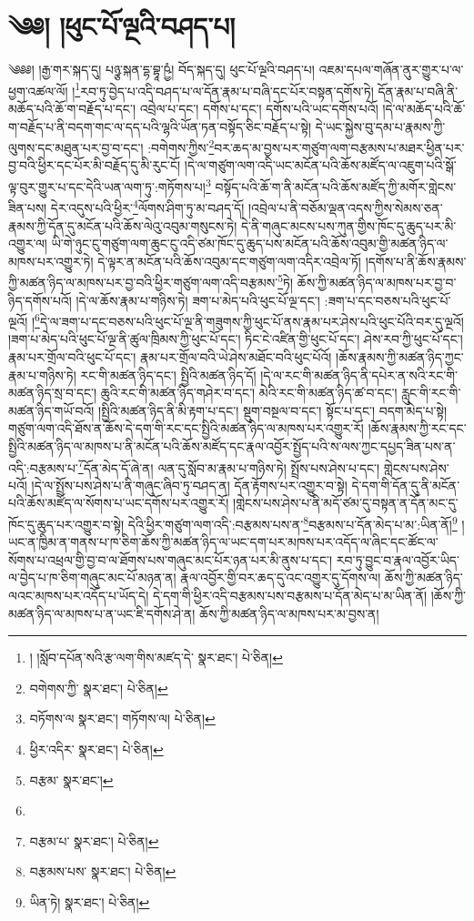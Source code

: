 \setcounter{footnote}{0} 
\chapter{༄༅། །ཕུང་པོ་ལྔའི་བཤད་པ།}༄༅༅། །རྒྱ་གར་སྐད་དུ། པཉྩ་སྐན་དྷ་བྷཱ་ཥྱཾ། བོད་སྐད་དུ། ཕུང་པོ་ལྔའི་བཤད་པ། འཇམ་དཔལ་གཞོན་ནུར་གྱུར་པ་ལ་ཕྱག་འཚལ་ལོ། །\footnote{། །སློབ་དཔོན་སའི་རྩ་ལག་གིས་མཛད་དེ་  སྣར་ཐང་།  པེ་ཅིན། }རབ་ཏུ་བྱེད་པ་འདི་བཤད་པ་ལ་དོན་རྣམ་པ་བཞི་དང་པོར་བསྟན་དགོས་ཏེ། དོན་རྣམ་པ་བཞི་ནི་མཆོད་པའི་ཆོ་ག་བརྗོད་པ་དང་། འབྲེལ་པ་དང་། དགོས་པ་དང་། དགོས་པའི་ཡང་དགོས་པའོ། །དེ་ལ་མཆོད་པའི་ཆོ་ག་བརྗོད་པ་ནི་བདག་གང་ལ་དད་པའི་ལྷའི་ཡོན་ཏན་བསྟོད་ཅིང་བརྗོད་པ་སྟེ། དེ་ཡང་སྐྱེས་བུ་དམ་པ་རྣམས་ཀྱི་ལུགས་དང་མཐུན་པར་བྱ་བ་དང་། :བགེགས་ཀྱིས་\footnote{བགེགས་ཀྱི་  སྣར་ཐང་།  པེ་ཅིན། }བར་ཆད་མ་བྱས་པར་གཙུག་ལག་བརྩམས་པ་མཐར་ཕྱིན་པར་བྱ་བའི་ཕྱིར་དང་པོར་མི་བརྗོད་དུ་མི་རུང་ངོ། །དེ་ལ་གཙུག་ལག་འདི་ཡང་མངོན་པའི་ཆོས་མཛོད་ལ་འཇུག་པའི་སྒོ་ལྟ་བུར་གྱུར་པ་དང་དེའི་ཡན་ལག་ཏུ་:གཏོགས་པ།\footnote{བཏོགས་ལ  སྣར་ཐང་། གཏོགས་ལ།  པེ་ཅིན། } བསྟོད་པའི་ཆོ་ག་ནི་མངོན་པའི་ཆོས་མཛོད་ཀྱི་མགོར་གླེངས་ཟིན་པས། དེར་འདུས་པའི་ཕྱིར་\footnote{ཕྱིར་འདིར་  སྣར་ཐང་།  པེ་ཅིན། }ལོགས་ཤིག་ཏུ་མ་བཤད་དོ། །འབྲེལ་པ་ནི་བཅོམ་ལྡན་འདས་ཀྱིས་སེམས་ཅན་རྣམས་ཀྱི་དོན་དུ་མངོན་པའི་ཆོས་ལེའུ་འབུམ་གསུངས་ཏེ། དེ་ནི་གཞུང་མངས་པས་ཀུན་གྱིས་ཁོང་དུ་ཆུད་པར་མི་འགྱུར་ལ། ཡི་གེ་ཉུང་ངུ་གཙུག་ལག་ཆུང་ངུ་འདི་ཙམ་ཁོང་དུ་ཆུད་པས་མངོན་པའི་ཆོས་འབུམ་གྱི་མཚན་ཉིད་ལ་མཁས་པར་འགྱུར་ཏེ། དེ་ལྟར་ན་མངོན་པའི་ཆོས་འབུམ་དང་གཙུག་ལག་འདིར་འབྲེལ་ཏོ། །དགོས་པ་ནི་ཆོས་རྣམས་ཀྱི་མཚན་ཉིད་ལ་མཁས་པར་བྱ་བའི་ཕྱིར་གཙུག་ལག་འདི་བརྩམས་\footnote{བརྩམ་  སྣར་ཐང་། }ཏེ། ཆོས་ཀྱི་མཚན་ཉིད་ལ་མཁས་པར་བྱ་བ་ཉིད་དགོས་པའོ། །དེ་ལ་ཆོས་རྣམ་པ་གཉིས་ཏེ། ཟག་པ་མེད་པའི་ཕུང་པོ་ལྔ་དང་། :ཟག་པ་དང་བཅས་པའི་ཕུང་པོ་ལྔའོ། །\footnote{}དེ་ལ་ཟག་པ་དང་བཅས་པའི་ཕུང་པོ་ལྔ་ནི་གཟུགས་ཀྱི་ཕུང་པོ་ནས་རྣམ་པར་ཤེས་པའི་ཕུང་པོའི་བར་དུ་ལྔའོ། །ཟག་པ་མེད་པའི་ཕུང་པོ་ལྔ་ནི་ཚུལ་ཁྲིམས་ཀྱི་ཕུང་པོ་དང་། ཏིང་ངེ་འཛིན་གྱི་ཕུང་པོ་དང་། ཤེས་རབ་ཀྱི་ཕུང་པོ་དང་། རྣམ་པར་གྲོལ་བའི་ཕུང་པོ་དང་། རྣམ་པར་གྲོལ་བའི་ཡེ་ཤེས་མཐོང་བའི་ཕུང་པོའོ། །ཆོས་རྣམས་ཀྱི་མཚན་ཉིད་ཀྱང་རྣམ་པ་གཉིས་ཏེ། རང་གི་མཚན་ཉིད་དང་། སྤྱིའི་མཚན་ཉིད་དོ། །དེ་ལ་རང་གི་མཚན་ཉིད་ནི་དཔེར་ན་སའི་རང་གི་མཚན་ཉིད་སྲ་བ་དང་། ཆུའི་རང་གི་མཚན་ཉིད་གཤེར་བ་དང་། མེའི་རང་གི་མཚན་ཉིད་ཚ་བ་དང་། རླུང་གི་རང་གི་མཚན་ཉིད་གཡོ་བའོ། །སྤྱིའི་མཚན་ཉིད་ནི་མི་རྟག་པ་དང་། སྡུག་བསྔལ་བ་དང་། སྟོང་པ་དང་། བདག་མེད་པ་སྟེ། གཙུག་ལག་འདི་ཐོས་ན་ཆོས་དེ་དག་གི་རང་དང་སྤྱིའི་མཚན་ཉིད་ལ་མཁས་པར་འགྱུར་རོ། །ཆོས་རྣམས་ཀྱི་རང་དང་སྤྱིའི་མཚན་ཉིད་ལ་མཁས་པ་ནི་མངོན་པའི་ཆོས་མཛོད་དང་རྣལ་འབྱོར་སྤྱོད་པའི་ས་ལས་ཀྱང་དཔྱད་ཟིན་པས་ན་འདི་:བརྩམས་པ་\footnote{བརྩམ་པ་  སྣར་ཐང་།  པེ་ཅིན། }དོན་མེད་དོ་ཞེ་ན། ལན་དུ་སློབ་མ་རྣམ་པ་གཉིས་ཏེ། སྤྲོས་པས་ཤེས་པ་དང་། གླེངས་པས་ཤེས་པའོ། །དེ་ལ་སྤྲོས་པས་ཤེས་པ་ནི་གཞུང་ཞིབ་ཏུ་བཤད་ན། དོན་རྟོགས་པར་འགྱུར་བ་སྟེ། དེ་དག་གི་དོན་དུ་ནི་མངོན་པའི་ཆོས་མཛོད་ལ་སོགས་པ་ཡང་དགོས་པར་འགྱུར་རོ། །གླེངས་པས་ཤེས་པ་ནི་མདོ་ཙམ་དུ་བསྟན་ན་དོན་མང་དུ་ཁོང་དུ་ཆུད་པར་འགྱུར་བ་སྟེ། དེའི་ཕྱིར་གཙུག་ལག་འདི་:བརྩམས་པས་ན་\footnote{བརྩམས་པས་  སྣར་ཐང་།  པེ་ཅིན། }བརྩམས་པ་དོན་མེད་པ་མ་:ཡིན་ནོ།\footnote{ཡིན་ཏེ།  སྣར་ཐང་།  པེ་ཅིན། } །ཡང་ན་ཁྱིམ་ན་གནས་པ་ཁ་ཅིག་ཆོས་ཀྱི་མཚན་ཉིད་ལ་ཡང་དག་པར་མཁས་པར་འདོད་ལ་ཞིང་དང་ཚོང་ལ་སོགས་པ་འཕྲལ་གྱི་བྱ་བ་ལ་ཐོགས་པས་གཞུང་མང་པོར་ཉན་པར་མི་ནུས་པ་དང་། རབ་ཏུ་བྱུང་བ་རྣལ་འབྱོར་ཡིད་ལ་བྱེད་པ་ཁ་ཅིག་གཞུང་མང་པོ་མཉན་ན། རྣལ་འབྱོར་གྱི་བར་ཆད་དུ་འང་འགྱུར་དུ་དོགས་ལ། ཆོས་ཀྱི་མཚན་ཉིད་ལའང་མཁས་པར་འདོད་པ་ཡོད་དེ། དེ་དག་གི་ཕྱིར་འདི་བརྩམས་པས་བརྩམས་པ་དོན་མེད་པ་མ་ཡིན་ནོ། །ཆོས་ཀྱི་མཚན་ཉིད་ལ་མཁས་པ་ན་ཡང་ཇི་དགོས་ཤེ་ན། ཆོས་ཀྱི་མཚན་ཉིད་ལ་མཁས་པར་མ་བྱས་ན། 